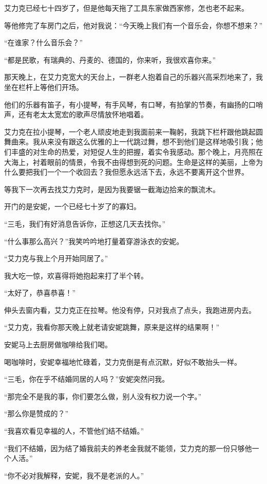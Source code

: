 \par 艾力克已经七十四岁了，但是他每天拖了工具东家做西家修，怎也老不起来。
\par 等他修完了车房门之后，他对我说：“今天晚上我们有一个音乐会，你想不想来？”
\par “在谁家？什么音乐会？”
\par “都是民歌，有瑞典的、丹麦的、德国的，你来听，我很欢喜你来。”
\par 那天晚上，在艾力克宽大的天台上，一群老人抱着自己的乐器兴高采烈地来了，我坐在栏杆上等他们开场。
\par 他们的乐器有笛子，有小提琴，有手风琴，有口琴，有拍掌的节奏，有幽扬的口哨声，还有老太太宽宏的歌声尽情放怀地唱着。
\par 艾力克在拉小提琴，一个老人顽皮地走到我面前来一鞠躬，我跳下栏杆跟他跳起圆舞曲来。我从来没有跟这么优雅的上一代跳过舞，想不到他们是这样地吸引我；他们丰盛的对生命的热爱，对短促人生的把握，着实令我感动。那个晚上，月亮照在大海上，衬着眼前的情景，令我不由得想到死的问题。生命是这样的美丽，上帝为什么要把我们一个一个收回去？我但愿永远活下去，永远不要离开这个世界。
\par 等我下一次再去找艾力克时，是因为我要锯一截海边拾来的飘流木。
\par 开门的是安妮，一个已经七十岁了的寡妇。
\par “三毛，我们有好消息告诉你，正想这几天去找你。”
\par “什么事那么高兴？”我笑吟吟地打量着穿游泳衣的安妮。
\par “艾力克与我上个月开始同居了。”
\par 我大吃一惊，欢喜得将她抱起来打了半个转。
\par “太好了，恭喜恭喜！”
\par 伸头去窗内看，艾力克正在拉琴。他没有停，只对我点了点头，我跑进房内去。
\par “艾力克，我看你那天晚上就老请安妮跳舞，原来是这样的结果啊！”
\par 安妮马上去厨房做咖啡给我们喝。
\par 喝咖啡时，安妮幸福地忙碌着，艾力克倒是有点沉默，好似不敢抬头一样。
\par “三毛，你在乎不结婚同居的人吗？”安妮突然问我。
\par “那完全不是我的事，你们要怎么做，别人没有权力说一个字。”
\par “那么你是赞成的？”
\par “我喜欢看见幸福的人，不管他们结不结婚。”
\par “我们不结婚，因为结了婚我前夫的养老金我就不能领，艾力克的那一份只够他一个人活。”
\par “你不必对我解释，安妮，我不是老派的人。”
